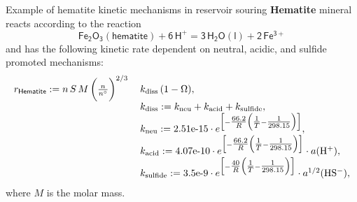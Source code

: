 \begin{frame}[fragile]{Example of hematite kinetic mechanisms in reservoir souring}
	\small
\alert{\bf Hematite} mineral reacts according to the reaction 
	\[\mathsf{Fe_{2}O_{3}(hematite)+6\,H^{+}=3\,H_{2}O(l)+2\,Fe^{3+}}\]
	and has the following kinetic rate dependent on neutral, acidic, and sulfide promoted mechanisms:
	\[
	\begin{array}{ll}
		r_{\sf Hematite}:=n \,S\,M\,\bigg(\frac{n}{n^\circ}\bigg)^{2/3}\: & k_{\rm diss}\,(1-\ensuremath{\Omega}), \\
		&  k_{\rm diss}:=k_{\rm neu}+k_{\rm acid}+k_{\rm sulfide},\\
		& k_{\rm neu}:=\mbox{2.51e-15}\cdot e^{\Big[-\tfrac{66.2}{R}\Big(\tfrac{1}{T}-\tfrac{1}{298.15}\Big)\Big]},\\
		& k_{\rm acid}:=\mbox{4.07e-10}\cdot e^{\Big[-\tfrac{66.2}{R}\Big(\tfrac{1}{T}-\tfrac{1}{298.15}\Big)\Big]}\cdot a({\rm H^{+}}),\\
		& k_{\rm sulfide}:=\mbox{3.5e-9}\cdot e^{\Big[-\tfrac{40}{R}\Big(\tfrac{1}{T}-\tfrac{1}{298.15}\Big)\Big]}\cdot a^{1/2}({\rm HS^{-}}),
	\end{array}
	\]
	where $M$ is the molar mass.
\end{frame}


